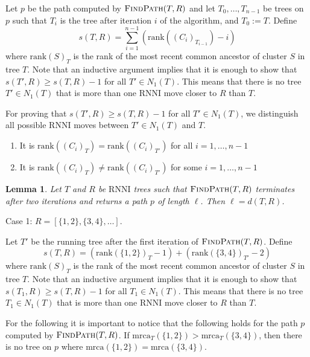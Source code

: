 \documentclass{amsart}
\newtheorem{lemma}{Lemma}
\newcommand{\rnni}{\mathrm{RNNI}}
\newcommand{\findpath}{\textsc{FindPath}}
\newcommand{\mrca}{\mathrm{mrca}}
\newcommand{\rank}{\mathrm{rank}}
\begin{document}
\proof

Let $p$ be the path computed by $\findpath(T,R)$ and let $T_0, \ldots, T_{n-1}$ be trees on $p$ such that $T_i$ is the tree after iteration $i$ of the algorithm, and $T_0 := T$.
Define
\[
s(T, R) = \sum\limits_{i=1}^{n-1} (\rank((C_i)_{T_{i-1}}) - i)
\]
where $\rank(S)_T$ is the rank of the most recent common ancestor of cluster $S$ in tree $T$.
Note that an inductive argument implies that it is enough to show that $s(T', R) \geq s(T, R) - 1$ for all $T' \in N_1(T)$.
This means that there is no tree $T' \in N_1(T)$ that is more than one $\rnni$ move closer to $R$ than $T$.

For proving that $s(T', R) \geq s(T, R) - 1$ for all $T' \in N_1(T)$, we distinguish all possible $\rnni$ moves between $T' \in N_1(T)$ and $T$.

\begin{enumerate}
    \item It is $\rank((C_i)_{T}) = \rank((C_i)_{T'})$ for all $i = 1, \ldots, n-1$
    \item It is $\rank((C_i)_{T}) \neq \rank((C_i)_{T'})$ for some $i = 1, \ldots, n-1$
\end{enumerate}


\endproof

\begin{lemma}
Let $T$ and $R$ be $\rnni$ trees such that $\findpath(T, R)$ terminates after two iterations and returns a path $p$ of length $\ell$.
Then $\ell = d(T, R)$.
\end{lemma}

\proof
Case 1: $R = [\{1, 2\}, \{3, 4\}, \ldots]$.

Let $T'$ be the running tree after the first iteration of $\findpath(T, R)$.
Define
\[
s(T, R) = (\rank(\{1,2\})_T - 1) + (\rank(\{3,4\})_{T'} - 2)
\]
where $\rank(S)_T$ is the rank of the most recent common ancestor of cluster $S$ in tree $T$.
Note that an inductive argument implies that it is enough to show that $s(T_1, R) \geq s(T, R) - 1$ for all $T_1 \in N_1(T)$.
This means that there is no tree $T_1 \in N_1(T)$ that is more than one $\rnni$ move closer to $R$ than $T$.

For the following it is important to notice that the following holds for the path $p$ computed by $\findpath(T,R)$.
If $\mrca_T(\{1,2\}) > \mrca_T(\{3,4\})$, then there is no tree on $p$ where $\mrca(\{1,2\}) = \mrca(\{3,4\})$.
\end{document}
